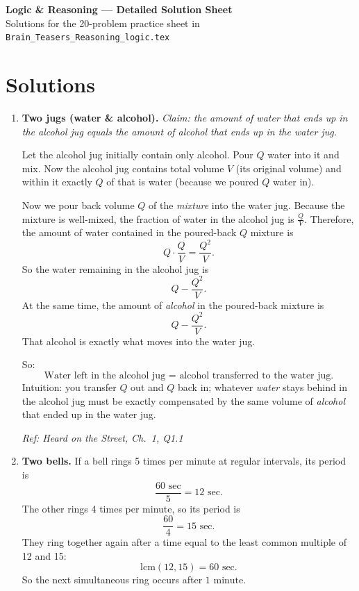 \documentclass[11pt]{article}
\begin{document}
\begin{center}
{\LARGE \textbf{Logic \& Reasoning — Detailed Solution Sheet}}\\[0.2em]
{\small Solutions for the 20-problem practice sheet in \texttt{Brain\_Teasers\_Reasoning\_logic.tex}}
\end{center}

\section*{Solutions}

\begin{enumerate}[label=\textbf{\arabic*.}]

\item \textbf{Two jugs (water \& alcohol).}
\emph{Claim: the amount of water that ends up in the alcohol jug equals the amount of alcohol that ends up in the water jug.}

Let the alcohol jug initially contain only alcohol. Pour $Q$ water into it and mix. Now the alcohol jug contains total volume $V$ (its original volume) and within it exactly $Q$ of that is water (because we poured $Q$ water in).

Now we pour back volume $Q$ of the \emph{mixture} into the water jug.
Because the mixture is well-mixed, the fraction of water in the alcohol jug is $\frac{Q}{V}$. Therefore, the amount of water contained in the poured-back $Q$ mixture is
\[
Q\cdot \frac{Q}{V}=\frac{Q^2}{V}.
\]
So the water remaining in the alcohol jug is
\[
Q-\frac{Q^2}{V}.
\]
At the same time, the amount of \emph{alcohol} in the poured-back mixture is
\[
Q-\frac{Q^2}{V}.
\]
That alcohol is exactly what moves into the water jug.

So:
\[
\boxed{\text{Water left in the alcohol jug }=\text{ alcohol transferred to the water jug.}}
\]
Intuition: you transfer $Q$ out and $Q$ back in; whatever \emph{water} stays behind in the alcohol jug must be exactly compensated by the same volume of \emph{alcohol} that ended up in the water jug.

\hfill{\small\textit{Ref: Heard on the Street, Ch.\ 1, Q1.1}}

\item \textbf{Two bells.}
If a bell rings 5 times per minute at regular intervals, its period is
\[
\frac{60\text{ sec}}{5}=12\text{ sec}.
\]
The other rings 4 times per minute, so its period is
\[
\frac{60}{4}=15\text{ sec}.
\]
They ring together again after a time equal to the least common multiple of 12 and 15:
\[
\mathrm{lcm}(12,15)=60\text{ sec}.
\]
So the next simultaneous ring occurs after \(\boxed{1\text{ minute}}\).


\end{enumerate}
\end{document}
